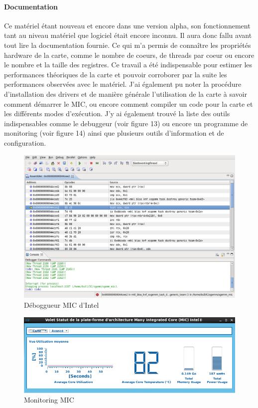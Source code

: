 \documentclass[11pt]{article}
\begin{document}
				\paragraph{Documentation}
				Ce matériel étant nouveau et encore dans une version alpha, son fonctionnement tant au niveau matériel que
				logiciel était encore inconnu. Il aura donc fallu avant tout lire la documentation fournie. Ce qui m'a permis de 
				connaître les propriétés hardware de la carte, comme le nombre de coeurs, de threads par coeur ou encore le 
				nombre et la taille des registres. Ce travail a été indispensable pour estimer les performances théoriques de la carte 
				et pouvoir corroborer par la suite les performances observées avec le matériel. \newline
				J'ai également pu noter la procédure d'installation des drivers et de manière générale l'utilisation
				de la carte à savoir comment démarrer le MIC, ou encore comment compiler un code pour la carte et les 
				différents modes d'exécution. \newline
				J'y ai également trouvé la liste des outils indispensables comme le debuggeur (voir figure 13) ou encore un programme de
				monitoring (voir figure 14) ainsi que plusieurs outils d'information et de configuration.
				\begin{figure}
				\begin{center}
				\includegraphics[scale=0.4]{Intel-Debugger.png}
				\caption{Déboggueur MIC d'Intel}
				\end{center}
				\end{figure}
				\begin{figure}
				\begin{center}
				\includegraphics[scale=0.40]{monitor_mic.png}
				\caption{Monitoring MIC}
				\end{center}
				\end{figure}
\end{document}
